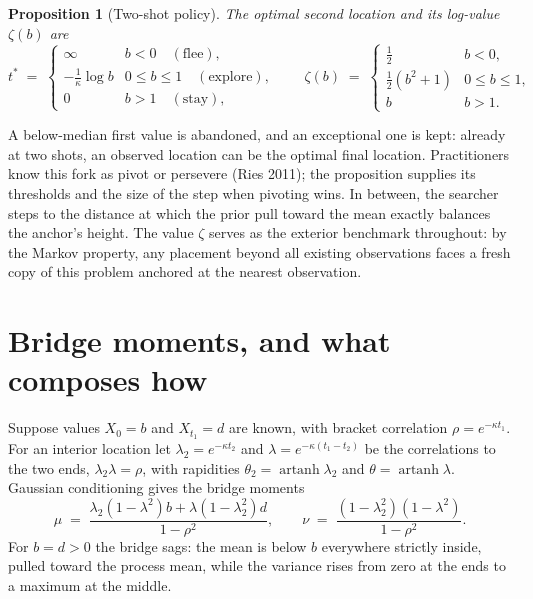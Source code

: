 \documentclass[11pt]{article}
\theoremstyle{itheads}
\newtheorem{proposition}{Proposition}
\newcommand{\artanh}{\operatorname{artanh}}
\begin{document}
\begin{proposition}[Two-shot policy]\label{prop:twoshot}
The optimal second location and its log-value $\zeta(b)$ are
\begin{equation}
t^{*} \;=\;
\begin{cases}
\infty & b<0 \quad(\text{flee}),\\[2pt]
-\tfrac{1}{\kappa}\log b & 0\le b\le 1 \quad(\text{explore}),\\[2pt]
0 & b>1 \quad(\text{stay}),
\end{cases}
\qquad
\zeta(b) \;=\;
\begin{cases}
\tfrac{1}{2} & b<0,\\[2pt]
\tfrac{1}{2}\left(b^{2}+1\right) & 0\le b\le 1,\\[2pt]
b & b>1 .
\end{cases}
\end{equation}
\end{proposition}

A below-median first value is abandoned, and an exceptional one is
kept: already at two shots, an observed location can be the optimal
final location. Practitioners know this fork as pivot or persevere
(Ries 2011); the proposition supplies its thresholds and the size of
the step when pivoting wins. In between, the searcher steps to the distance at which the
prior pull toward the mean exactly balances the anchor's height. The
value $\zeta$ serves as the exterior benchmark throughout: by the
Markov property, any placement beyond all existing observations faces a
fresh copy of this problem anchored at the nearest observation.

\section{Bridge moments, and what composes how}

Suppose values $X_0=b$ and $X_{t_1}=d$ are known, with bracket
correlation $\rho=e^{-\kappa t_1}$. For an interior location let
$\lambda_2=e^{-\kappa t_2}$ and $\lambda=e^{-\kappa(t_1-t_2)}$ be the
correlations to the two ends, $\lambda_2\lambda=\rho$, with rapidities
$\theta_2=\artanh\lambda_2$ and $\theta=\artanh\lambda$. Gaussian
conditioning gives the bridge moments
\begin{equation}\label{eq:bridge}
\mu \;=\; \frac{\lambda_2\!\left(1-\lambda^{2}\right)b
+ \lambda\!\left(1-\lambda_2^{2}\right)d}{1-\rho^{2}},
\qquad
\nu \;=\; \frac{\left(1-\lambda_2^{2}\right)\left(1-\lambda^{2}\right)}
{1-\rho^{2}} .
\end{equation}
For $b=d>0$ the bridge sags: the mean is below $b$ everywhere
strictly inside, pulled toward the process mean, while the variance
rises from zero at the ends to a maximum at the middle.
\end{document}
